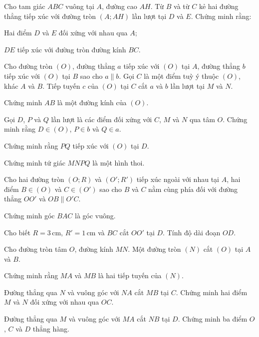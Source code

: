 \begin{practice}
\begin{questions}[resume=SBT]
        \item Cho tam giác $ABC$ vuông tại $A$, đường cao $AH$. Từ $B$ và từ $C$ kẻ hai đường thẳng tiếp xúc với đường tròn $(A;AH)$ lần lượt tại $D$ và $E$. Chứng minh rằng:
        \begin{questions}
            \item Hai điểm $D$ và $E$ đối xứng với nhau qua $A$;
            \item $DE$ tiếp xúc với đường tròn đường kính $BC$.
        \end{questions}
        \answerline
        \answerline

        \item Cho đường tròn $(O)$, đường thẳng $a$ tiếp xúc với $(O)$ tại $A$, đường thẳng $b$ tiếp xúc với $(O)$ tại $B$ sao cho $a\parallel b$. Gọi $C$ là một điểm tuỳ ý thuộc $(O)$, khác $A$ và $B$. Tiếp tuyến $c$ của $(O)$ tại $C$ cắt $a$ và $b$ lần lượt tại $M$ và $N$.
        \begin{questions}
            \item Chứng minh $AB$ là một đường kính của $(O)$.
            \item Gọi $D$, $P$ và $Q$ lần lượt là các điểm đối xứng với $C$, $M$ và $N$ qua tâm $O$. Chứng minh rằng $D\in(O)$, $P\in b$ và $Q\in a$.
            \item Chứng minh rằng $PQ$ tiếp xúc với $(O)$ tại $D$.
            \item Chứng minh tứ giác $MNPQ$ là một hình thoi.
        \end{questions}
        \answerline
        \answerline
        \answerline

        \item Cho hai đường tròn $(O;R)$ và $(O';R')$ tiếp xúc ngoài với nhau tại $A$, hai điểm $B\in(O)$ và $C\in(O')$ sao cho $B$ và $C$ nằm cùng phía đối với đường thẳng $OO'$ và $OB\parallel O'C$.
        \begin{questions}
            \item Chứng minh góc $BAC$ là góc vuông.
            \item Cho biết $R=3\,\mathrm{cm}$, $R'=1\,\mathrm{cm}$ và $BC$ cắt $OO'$ tại $D$. Tính độ dài đoạn $OD$.
        \end{questions}
        \answerline
        \answerline

        \item Cho đường tròn tâm $O$, đường kính $MN$. Một đường tròn $(N)$ cắt $(O)$ tại $A$ và $B$.
        \begin{questions}
            \item Chứng minh rằng $MA$ và $MB$ là hai tiếp tuyến của $(N)$.
            \item Đường thẳng qua $N$ và vuông góc với $NA$ cắt $MB$ tại $C$. Chứng minh hai điểm $M$ và $N$ đối xứng với nhau qua $OC$.
            \item Đường thẳng qua $M$ và vuông góc với $MA$ cắt $NB$ tại $D$. Chứng minh ba điểm $O$, $C$ và $D$ thẳng hàng.
        \end{questions}
        \answerline
        \answerline
        \answerline
    \end{questions}
\end{practice}
